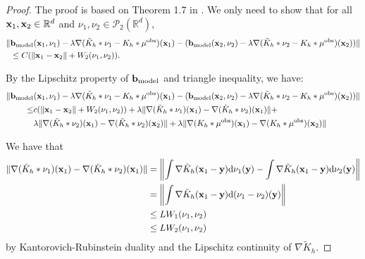 \begin{proof}
The proof is based on Theorem 1.7 in \cite{carmona2016lectures}. We only need to show that for all $\mathbf{x}_1,\mathbf{x}_2 \in \mathbb R^d $ and $\nu_1,\nu_2\in \mathcal P_2 (\mathbb R^d)$, 
\begin{align*}
\|&\mathbf{b}_{\mathrm{model}}(\mathbf{x}_1,\nu_1) - \lambda \nabla (\tilde{K}_h*\nu_1-K_h * \mu^\mathrm{obs})(\mathbf{x}_1) - (\mathbf{b}_{\mathrm{model}}(\mathbf{x}_2,\nu_2) - \lambda \nabla (\tilde{K}_h*\nu_2-K_h * \mu^\mathrm{obs})(\mathbf{x}_2))\| \\ & \leq C(\|\mathbf{x}_1-\mathbf{x}_2\| + W_2(\nu_1,\nu_2)).
\end{align*}

By the Lipschitz property of $\mathbf{b}_\mathrm{model}$ and triangle inequality, we have:
\begin{equation}
\label{equ:proof_eq}
\begin{aligned}
\|\mathbf{b}_{\mathrm{model}}&(\mathbf{x}_1,\nu_1) - \lambda \nabla (\tilde{K}_h*\nu_1-K_h * \mu^\mathrm{obs})(\mathbf{x}_1) - (\mathbf{b}_{\mathrm{model}}(\mathbf{x}_2,\nu_2) - \lambda \nabla (\tilde{K}_h*\nu_2-K_h * \mu^\mathrm{obs})(\mathbf{x}_2))\| \\
\leq & c(\|\mathbf{x}_1-\mathbf{x}_2\|+ W_2(\nu_1,\nu_2)) + \lambda \|\nabla(\tilde{K}_h*\nu_1)(\mathbf{x}_1)-\nabla(\tilde{K}_h*\nu_2)(\mathbf{x}_1)\| + \\
&\lambda \|\nabla(\tilde{K}_h*\nu_2)(\mathbf{x}_1)-\nabla(\tilde{K}_h*\nu_2)(\mathbf{x}_2)\| + \lambda \|\nabla(K_h*\mu^\mathrm{obs})(\mathbf{x}_1)-\nabla(K_h*\mu^\mathrm{obs})(\mathbf{x}_2)\|
\end{aligned}
\end{equation}

We have that
\begin{align*}
\|\nabla(\tilde{K}_h*\nu_1)(\mathbf{x}_1)-\nabla(\tilde{K}_h*\nu_2)(\mathbf{x}_1)\| &= \left\|\int \nabla \tilde{K}_h(\mathbf{x}_1-\mathbf{y})\mathrm{d}\nu_1(\mathbf{y}) -\int \nabla \tilde{K}_h (\mathbf{x}_1-\mathbf{y})\mathrm{d}\nu_2(\mathbf{y})\right\|\\
& = \left\|\int \nabla \tilde{K}_h(\mathbf{x}_1-\mathbf{y})\mathrm{d}(\nu_1-\nu_2)(\mathbf{y})\right\|\\
&\leq L W_1(\nu_1,\nu_2) \\
&\leq L W_2(\nu_1,\nu_2)
\end{align*}
by Kantorovich-Rubinstein duality and the Lipschitz continuity of $\nabla \tilde{K}_h$.


\end{proof}
